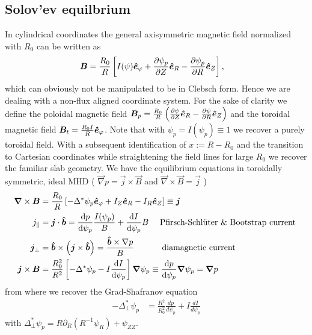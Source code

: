 \subsection{Solov'ev equilbrium}\label{sec:solovev}
In cylindrical coordinates the general axisymmetric magnetic field normalized with $R_0$ can be written as
\begin{align}
 {\boldsymbol{B}} &= \frac{R_0}{R}\left[I(\psi) \bm{\hat{e}}_{\varphi} + \frac{\partial
 \psi_p}{\partial Z} \bm{\hat{e}}_R -  \frac{\partial \psi_p}{\partial R} \bm{\hat{e}}_Z\right] ,
\end{align}
which can obviously not be manipulated to be in Clebsch form. Hence we are dealing with a non-flux aligned coordinate system.
For the sake of clarity we define the poloidal magnetic field \( {\boldsymbol{B}}_p = \frac{R_0}{R}\left( \frac{\partial \psi}{\partial Z}\bm{\hat{e}}_R - \frac{\partial \psi}{\partial R}\bm{\hat{e}}_Z\right)
\) and the toroidal magnetic field \({\boldsymbol{B}}_t =\frac{R_0I}{R} \bm{\hat{e}}_{\varphi}\).
Note that with $\psi_p = I(\psi_p) \equiv 1$ we recover a purely toroidal field.
With a subsequent identification of $x:=R-R_0$ and the transition to
Cartesian coordinates while straightening the field lines for large $R_0$
we recover the familiar slab geometry.
We have
the equilibrium equations in toroidally symmetric, ideal MHD (
$\vec\nabla p = \vec j\times \vec B$ and $\vec \nabla\times\vec B = \vec j$ )
\begin{align}
    {\boldsymbol{\nabla}}\times {\boldsymbol{B}} &= \frac{R_0}{R}\left[ -\Delta^*\psi_p\bm{\hat{e}}_\varphi + I_Z \bm{\hat{e}}_R - I_R\bm{\hat{e}}_Z \right]\equiv {\boldsymbol{j}}\\
 j_\parallel &= {\boldsymbol{j}}\cdot \bm{\hat{b}} = \frac{\mathrm{d} p}{\mathrm{d}\psi_p} \frac{I(\psi_p)}{B} +
 \frac{\mathrm{d} I}{\mathrm{d}\psi_p} B \quad \text{  Pfirsch-Schl\"uter \& Bootstrap current } \\
 {\boldsymbol{j}}_\perp &= \bm{\hat{b}}\times\left({\boldsymbol{j}}\times\bm{\hat{b}}\right)=
 \frac{\bm{\hat{b}} \times \nabla p}{B} \quad\quad\quad \text{ diamagnetic current} \\
 {\boldsymbol{j}}\times{\boldsymbol{B}} &= \frac{R_0^2}{R^2}\left[ -\Delta^* \psi_p - I
     \frac{\mathrm{d} I}{\mathrm{d} \psi_p} \right]{\boldsymbol{\nabla}}\psi_p \equiv \frac{\mathrm{d} p}{\mathrm{d}\psi_p}{\boldsymbol{\nabla}}\psi_p ={\boldsymbol{\nabla}} p
\end{align}
from where we recover the Grad-Shafranov equation
\begin{align}\label{eq:GSEdimless}
 -\Delta^*_\perp  \psi_p &= \frac{R^2}{R_0^2} \frac{d p}{d  \psi_p } + I \frac{d I}{d  \psi_p }
\end{align}
with $\Delta^*_\perp \psi_p = R\partial_R (R^{-1}\psi_R) + \psi_{ZZ}$.
